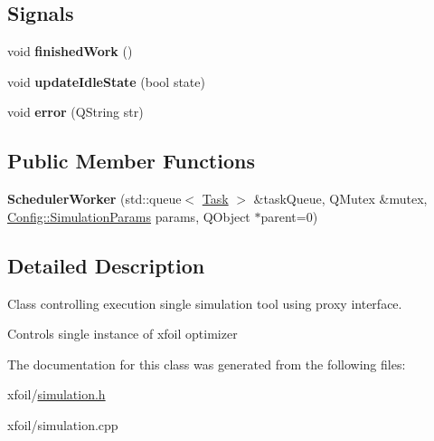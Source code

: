 \subsection*{Signals}
\begin{DoxyCompactItemize}
\item 
\hypertarget{class_scheduler_worker_a2fd120b582cb00372117bbd5b1f2238d}{}\label{class_scheduler_worker_a2fd120b582cb00372117bbd5b1f2238d} 
void {\bfseries finished\+Work} ()
\item 
\hypertarget{class_scheduler_worker_a6258fd2861a3ce7798436f017b5de36a}{}\label{class_scheduler_worker_a6258fd2861a3ce7798436f017b5de36a} 
void {\bfseries update\+Idle\+State} (bool state)
\item 
\hypertarget{class_scheduler_worker_a12e2df7be830c191c58afe3aead3b942}{}\label{class_scheduler_worker_a12e2df7be830c191c58afe3aead3b942} 
void {\bfseries error} (Q\+String str)
\end{DoxyCompactItemize}
\subsection*{Public Member Functions}
\begin{DoxyCompactItemize}
\item 
\hypertarget{class_scheduler_worker_abbce89dd767e79876256848966f38dda}{}\label{class_scheduler_worker_abbce89dd767e79876256848966f38dda} 
{\bfseries Scheduler\+Worker} (std\+::queue$<$ \hyperlink{struct_task}{Task} $>$ \&task\+Queue, Q\+Mutex \&mutex, \hyperlink{struct_config_1_1_simulation_params}{Config\+::\+Simulation\+Params} params, Q\+Object $\ast$parent=0)
\end{DoxyCompactItemize}


\subsection{Detailed Description}
Class controlling execution single simulation tool using proxy interface. 

Controls single instance of xfoil optimizer 

The documentation for this class was generated from the following files\+:\begin{DoxyCompactItemize}
\item 
xfoil/\hyperlink{simulation_8h}{simulation.\+h}\item 
xfoil/simulation.\+cpp\end{DoxyCompactItemize}
